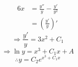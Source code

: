 \item

\begin{align*}
	6x
	&= \frac{y''}{y} - \frac{y'}{y^2} \\
	&= \left( \frac{y'}{y} \right)'
\end{align*}
\[
	\Rightarrow \frac{y'}{y} = 3x^2 + C_1
\]
\[
	\Rightarrow \ln y = x^3 + C_1 x + A
\]
\[
	\therefore y = C_2 e^{x^3 + C_1 x}
\]